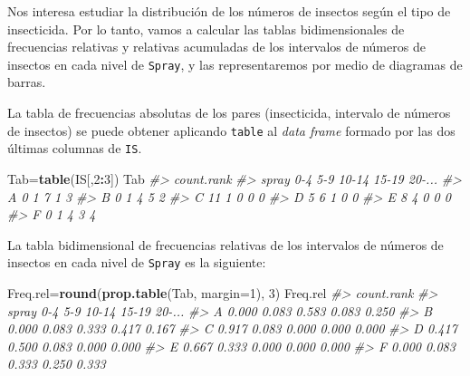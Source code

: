 \documentclass[
]{book}
\newenvironment{Shaded}{\begin{snugshade}}{\end{snugshade}}
\newcommand{\CommentTok}[1]{\textcolor[rgb]{0.56,0.35,0.01}{\textit{#1}}}
\newcommand{\DataTypeTok}[1]{\textcolor[rgb]{0.13,0.29,0.53}{#1}}
\newcommand{\DecValTok}[1]{\textcolor[rgb]{0.00,0.00,0.81}{#1}}
\newcommand{\KeywordTok}[1]{\textcolor[rgb]{0.13,0.29,0.53}{\textbf{#1}}}
\newcommand{\NormalTok}[1]{#1}
\newcommand{\OperatorTok}[1]{\textcolor[rgb]{0.81,0.36,0.00}{\textbf{#1}}}
\theoremstyle{definition}
\theoremstyle{definition}
\theoremstyle{definition}
\theoremstyle{remark}
\begin{document}
Nos interesa estudiar la distribución de los números de insectos según el tipo de insecticida. Por lo tanto, vamos a calcular las tablas bidimensionales de frecuencias relativas y relativas acumuladas de los intervalos de números de insectos en cada nivel de \texttt{Spray}, y las representaremos por medio de diagramas de barras.

La tabla de frecuencias absolutas de los pares (insecticida, intervalo de números de insectos) se puede obtener aplicando \texttt{table} al \emph{data frame} formado por las dos últimas columnas de \texttt{IS}.

\begin{Shaded}
\begin{Highlighting}[]
\NormalTok{Tab=}\KeywordTok{table}\NormalTok{(IS[,}\DecValTok{2}\OperatorTok{:}\DecValTok{3}\NormalTok{])}
\NormalTok{Tab}
\CommentTok{\#\textgreater{}      count.rank}
\CommentTok{\#\textgreater{} spray 0{-}4 5{-}9 10{-}14 15{-}19 20{-}...}
\CommentTok{\#\textgreater{}     A   0   1     7     1      3}
\CommentTok{\#\textgreater{}     B   0   1     4     5      2}
\CommentTok{\#\textgreater{}     C  11   1     0     0      0}
\CommentTok{\#\textgreater{}     D   5   6     1     0      0}
\CommentTok{\#\textgreater{}     E   8   4     0     0      0}
\CommentTok{\#\textgreater{}     F   0   1     4     3      4}
\end{Highlighting}
\end{Shaded}

La tabla bidimensional de frecuencias relativas de los intervalos de números de insectos en cada nivel de \texttt{Spray} es la siguiente:

\begin{Shaded}
\begin{Highlighting}[]
\NormalTok{Freq.rel=}\KeywordTok{round}\NormalTok{(}\KeywordTok{prop.table}\NormalTok{(Tab, }\DataTypeTok{margin=}\DecValTok{1}\NormalTok{), }\DecValTok{3}\NormalTok{)}
\NormalTok{Freq.rel}
\CommentTok{\#\textgreater{}      count.rank}
\CommentTok{\#\textgreater{} spray   0{-}4   5{-}9 10{-}14 15{-}19 20{-}...}
\CommentTok{\#\textgreater{}     A 0.000 0.083 0.583 0.083  0.250}
\CommentTok{\#\textgreater{}     B 0.000 0.083 0.333 0.417  0.167}
\CommentTok{\#\textgreater{}     C 0.917 0.083 0.000 0.000  0.000}
\CommentTok{\#\textgreater{}     D 0.417 0.500 0.083 0.000  0.000}
\CommentTok{\#\textgreater{}     E 0.667 0.333 0.000 0.000  0.000}
\CommentTok{\#\textgreater{}     F 0.000 0.083 0.333 0.250  0.333}
\end{Highlighting}
\end{Shaded}
\end{document}
